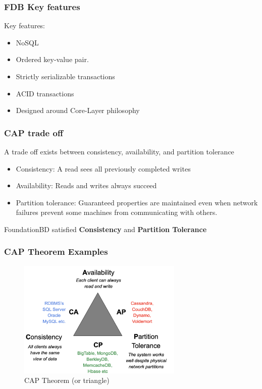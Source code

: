 \begin{frame}
	\frametitle{FDB Key features}

Key features:
\begin{itemize}
    \item NoSQL
    \item Ordered key-value pair.
    \item Strictly serializable transactions
    \item ACID transactions
    \item Designed around Core-Layer philosophy 
    
\end{itemize}

\end{frame}
\begin{frame}
	\frametitle{CAP trade off}

A trade off exists between consistency, availability, and
partition tolerance
\begin{itemize}
    \item Consistency: A read sees all previously completed writes
    \item Availability: Reads and writes always succeed
    \item Partition tolerance: Guaranteed properties are maintained even when network failures prevent some machines from communicating with others.
    
\end{itemize}
FoundationBD satisfied \textbf{Consistency} and \textbf{Partition Tolerance} 

\end{frame}
\begin{frame}
	\frametitle{CAP Theorem Examples}

\begin{figure}[h]
    \centering
    \includegraphics[width=0.7\textwidth]{img/1-Introduction/CAP theorem.png}
    \caption{CAP Theorem (or triangle)}
\end{figure}

\end{frame}

